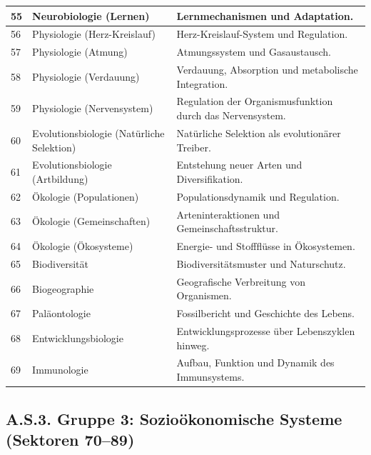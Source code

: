 \documentclass[13pt,a4paper]{article}
\begin{document}
\begin{longtable}{|p{0.9cm}|p{6.0cm}|p{8.6cm}|}
		55 & Neurobiologie (Lernen) & Lernmechanismen und Adaptation. \\
		\hline
		56 & Physiologie (Herz-Kreislauf) & Herz-Kreislauf-System und Regulation. \\
		\hline
		57 & Physiologie (Atmung) & Atmungssystem und Gasaustausch. \\
		\hline
		58 & Physiologie (Verdauung) & Verdauung, Absorption und metabolische Integration. \\
		\hline
		59 & Physiologie (Nervensystem) & Regulation der Organismusfunktion durch das Nervensystem. \\
		\hline
		60 & Evolutionsbiologie (Natürliche Selektion) & Natürliche Selektion als evolutionärer Treiber. \\
		\hline
		61 & Evolutionsbiologie (Artbildung) & Entstehung neuer Arten und Diversifikation. \\
		\hline
		62 & Ökologie (Populationen) & Populationsdynamik und Regulation. \\
		\hline
		63 & Ökologie (Gemeinschaften) & Arteninteraktionen und Gemeinschaftsstruktur. \\
		\hline
		64 & Ökologie (Ökosysteme) & Energie- und Stoffflüsse in Ökosystemen. \\
		\hline
		65 & Biodiversität & Biodiversitätsmuster und Naturschutz. \\
		\hline
		66 & Biogeographie & Geografische Verbreitung von Organismen. \\
		\hline
		67 & Paläontologie & Fossilbericht und Geschichte des Lebens. \\
		\hline
		68 & Entwicklungsbiologie & Entwicklungsprozesse über Lebenszyklen hinweg. \\
		\hline
		69 & Immunologie & Aufbau, Funktion und Dynamik des Immunsystems. \\
		\hline
	\end{longtable}
	
	\subsection*{A.S.3. Gruppe 3: Sozioökonomische Systeme (Sektoren 70--89)}
	
\end{document}
